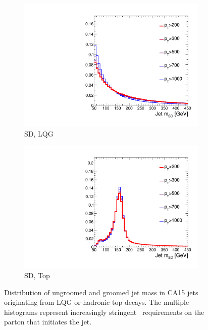 \begin{figure}[]
\begin{center}
\begin{subfigure}[t]{0.35\textwidth}
            \includegraphics[width=\textwidth]{figures/toptagging/gen/norm_clf_MSD_QCD.pdf}
            \caption{SD, LQG}
        \end{subfigure}
        \begin{subfigure}[t]{0.35\textwidth}
            \includegraphics[width=\textwidth]{figures/toptagging/gen/norm_clf_MSD_ZpTT_lo.pdf}
            \caption{SD, Top}
        \end{subfigure}
        \caption{Distribution of ungroomed and groomed jet mass in CA15 jets originating from LQG or hadronic top decays.
                 The multiple histograms represent increasingly stringent \pt~requirements on the parton that initiates the jet.}
        \label{fig:jets:msd}
    \end{center}
\end{figure}


